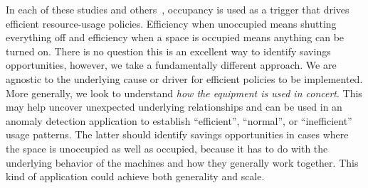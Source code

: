 In each of these studies and others~\cite{AgarwalBDGW11,buildanomaly}, occupancy is used as a trigger
that drives efficient resource-usage policies.  Efficiency
when unoccupied means shutting everything off and efficiency when a space is occupied means anything
can be turned on.  There is no question this is an excellent way to identify savings opportunities, however, we
take a fundamentally different approach.  We are agnostic to the underlying cause or driver for efficient
policies to be implemented.  More generally, we look to understand \emph{how the equipment is used in
concert}.  This may help uncover unexpected underlying relationships and can be used in an anomaly detection application
to establish ``efficient'', ``normal'', or ``inefficient'' usage patterns.  The latter 
should identify savings opportunities in cases where the space is unoccupied as well 
as occupied, because it has to do with the underlying behavior of the machines and how they generally work
together.  This kind of application could achieve both generality and scale.



